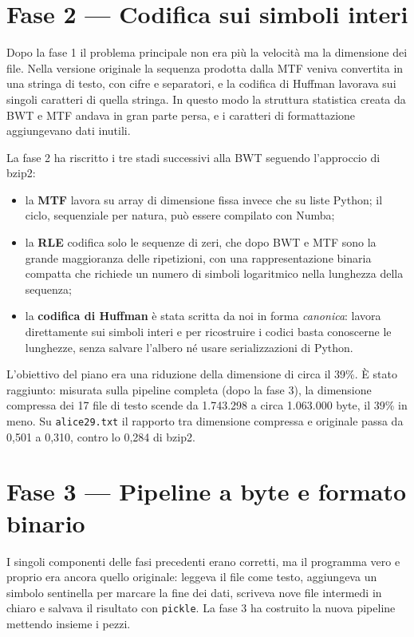 \documentclass[11pt,a4paper]{article}
\begin{document}
\section{Fase 2 --- Codifica sui simboli interi}

Dopo la fase 1 il problema principale non era più la velocità ma la dimensione dei file.
Nella versione originale la sequenza prodotta dalla MTF veniva convertita in una stringa di
testo, con cifre e separatori, e la codifica di Huffman lavorava sui singoli caratteri di
quella stringa. In questo modo la struttura statistica creata da BWT e MTF andava in gran
parte persa, e i caratteri di formattazione aggiungevano dati inutili.

La fase 2 ha riscritto i tre stadi successivi alla BWT seguendo l'approccio di bzip2:
\begin{itemize}
  \item la \textbf{MTF} lavora su array di dimensione fissa invece che su liste Python;
        il ciclo, sequenziale per natura, può essere compilato con Numba;
  \item la \textbf{RLE} codifica solo le sequenze di zeri, che dopo BWT e MTF sono la
        grande maggioranza delle ripetizioni, con una rappresentazione binaria compatta che
        richiede un numero di simboli logaritmico nella lunghezza della sequenza;
  \item la \textbf{codifica di Huffman} è stata scritta da noi in forma \emph{canonica}:
        lavora direttamente sui simboli interi e per ricostruire i codici basta conoscerne
        le lunghezze, senza salvare l'albero né usare serializzazioni di Python.
\end{itemize}

L'obiettivo del piano era una riduzione della dimensione di circa il 39\%. È stato
raggiunto: misurata sulla pipeline completa (dopo la fase 3), la dimensione compressa dei
17 file di testo scende da 1.743.298 a circa 1.063.000 byte, il 39\% in meno. Su
\texttt{alice29.txt} il rapporto tra dimensione compressa e originale passa da 0,501 a
0,310, contro lo 0,284 di bzip2.

\section{Fase 3 --- Pipeline a byte e formato binario}

I singoli componenti delle fasi precedenti erano corretti, ma il programma vero e proprio
era ancora quello originale: leggeva il file come testo, aggiungeva un simbolo sentinella
per marcare la fine dei dati, scriveva nove file intermedi in chiaro e salvava il risultato
con \texttt{pickle}. La fase 3 ha costruito la nuova pipeline mettendo insieme i pezzi.
\end{document}
